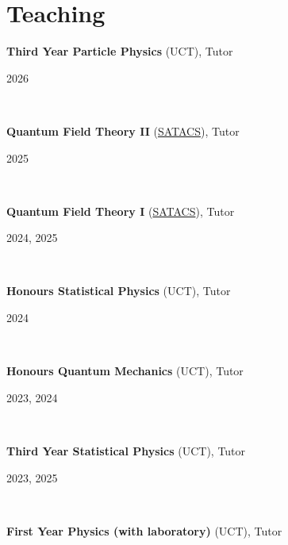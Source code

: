 \documentclass[11pt,letter,sans]{moderncv}
\begin{document}
\section{Teaching}
\begin{minipage}[t]{0.8\textwidth}
	\textbf{Third Year Particle Physics} (UCT), Tutor
\end{minipage}\hfill
\begin{minipage}[t]{0.2\textwidth}
  \hfill 2026 
\end{minipage}\\
\begin{minipage}[t]{0.8\textwidth}
	\textbf{Quantum Field Theory II} (\href{https://nithecs.ac.za/south-african-theory-and-computational-school/}{SATACS}), Tutor
\end{minipage}\hfill
\begin{minipage}[t]{0.2\textwidth}
  \hfill 2025 
\end{minipage}\\
\begin{minipage}[t]{0.8\textwidth}
	\textbf{Quantum Field Theory I} (\href{https://nithecs.ac.za/south-african-theory-and-computational-school/}{SATACS}), Tutor
\end{minipage}\hfill
\begin{minipage}[t]{0.2\textwidth}
  \hfill 2024, 2025 
\end{minipage}\\
\begin{minipage}[t]{0.8\textwidth}
	\textbf{Honours Statistical Physics} (UCT), Tutor
\end{minipage}\hfill
\begin{minipage}[t]{0.2\textwidth}
  \hfill 2024 
\end{minipage}\\
\begin{minipage}[t]{0.8\textwidth}
	\textbf{Honours Quantum Mechanics} (UCT), Tutor
\end{minipage}\hfill
\begin{minipage}[t]{0.2\textwidth}
  \hfill 2023, 2024 
\end{minipage}\\
\begin{minipage}[t]{0.8\textwidth}
	\textbf{Third Year Statistical Physics} (UCT), Tutor
\end{minipage}\hfill
\begin{minipage}[t]{0.2\textwidth}
  \hfill 2023, 2025 
\end{minipage}\\
\begin{minipage}[t]{0.8\textwidth}
	\textbf{First Year Physics (with laboratory)} (UCT), Tutor
\end{minipage}\hfill
\end{document}
